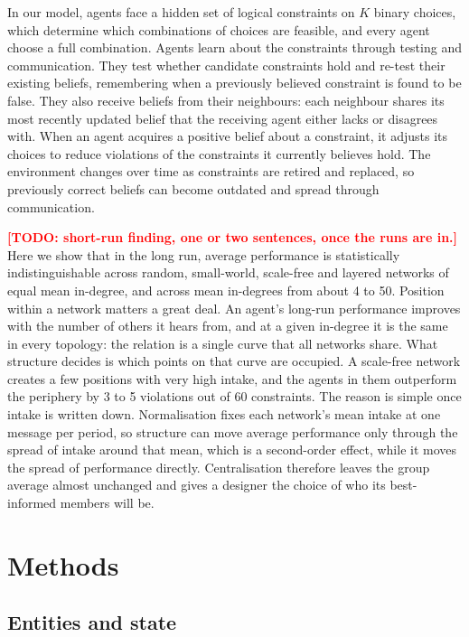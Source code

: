 \documentclass[11pt]{article}
\newcommand{\todo}[1]{\textcolor{red}{\textbf{[TODO: #1]}}}
\begin{document}
In our model, agents face a hidden set of logical constraints on $K$ binary choices, which determine which combinations of choices are feasible, and every agent choose a full combination. Agents learn about the constraints through testing and communication. They test whether candidate constraints hold and re-test their existing beliefs, remembering when a previously believed constraint is found to be false. They also receive beliefs from their neighbours: each neighbour shares its most recently updated belief that the receiving agent either lacks or disagrees with. When an agent acquires a positive belief about a constraint, it adjusts its choices to reduce violations of the constraints it currently believes hold. The environment changes over time as constraints are retired and replaced, so previously correct beliefs can become outdated and spread through communication.

\todo{short-run finding, one or two sentences, once the runs are in.} Here we show that in the long run, average performance is statistically indistinguishable across random, small-world, scale-free and layered networks of equal mean in-degree, and across mean in-degrees from about 4 to 50. Position within a network matters a great deal. An agent's long-run performance improves with the number of others it hears from, and at a given in-degree it is the same in every topology: the relation is a single curve that all networks share. What structure decides is which points on that curve are occupied. A scale-free network creates a few positions with very high intake, and the agents in them outperform the periphery by 3 to 5 violations out of 60 constraints. The reason is simple once intake is written down. Normalisation fixes each network's mean intake at one message per period, so structure can move average performance only through the spread of intake around that mean, which is a second-order effect, while it moves the spread of performance directly. Centralisation therefore leaves the group average almost unchanged and gives a designer the choice of who its best-informed members will be.


\section{Methods}\label{sec:methods}

\subsection{Entities and state}
\end{document}
